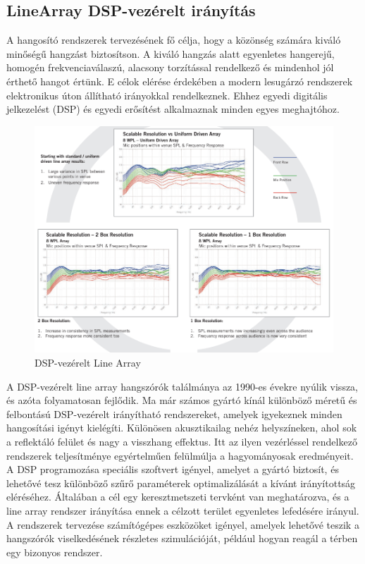 \subsection{LineArray DSP-vezérelt irányítás~\cite{AHNERT2023}}
A hangosító rendszerek tervezésének fő célja, hogy a közönség számára kiváló minőségű hangzást biztosítson. 
A kiváló hangzás alatt egyenletes hangerejű, homogén frekvenciaválaszú, alacsony torzítással rendelkező és mindenhol jól érthető hangot értünk. 
E célok elérése érdekében a modern lesugárzó rendszerek elektronikus úton állítható irányokkal rendelkeznek. 
Ehhez egyedi digitális jelkezelést (DSP) és egyedi erősítést alkalmaznak minden egyes meghajtóhoz.
\begin{figure}[H]
    \centering
    \includegraphics[width=\linewidth, keepaspectratio]{figures/dsp_arrays.png}
    \caption{DSP-vezérelt Line Array~\cite{AHNERT2023}}
    \label{fig:dsp_arrays}
\end{figure}
A DSP-vezérelt line array hangszórók találmánya az 1990-es évekre nyúlik vissza, és azóta folyamatosan fejlődik.
Ma már számos gyártó kínál különböző méretű és felbontású DSP-vezérelt irányítható rendszereket, 
amelyek igyekeznek minden hangosítási igényt kielégíti. 
Különösen akusztikailag nehéz helyszíneken, ahol sok a reflektáló felület és nagy a visszhang effektus. 
Itt az ilyen vezérléssel rendelkező rendszerek teljesítménye egyértelműen felülmúlja a hagyományosak eredményeit. 
A DSP programozása speciális szoftvert igényel, amelyet a gyártó biztosít, és lehetővé tesz különböző szűrő paraméterek optimalizálását a kívánt irányítottság eléréséhez. 
Általában a cél egy keresztmetszeti tervként van meghatározva, és a line array rendszer irányítása ennek a célzott terület egyenletes lefedésére irányul.
A rendszerek tervezése számítógépes eszközöket igényel, amelyek lehetővé teszik a hangszórók viselkedésének részletes szimulációját, például hogyan reagál a térben egy bizonyos rendszer.

